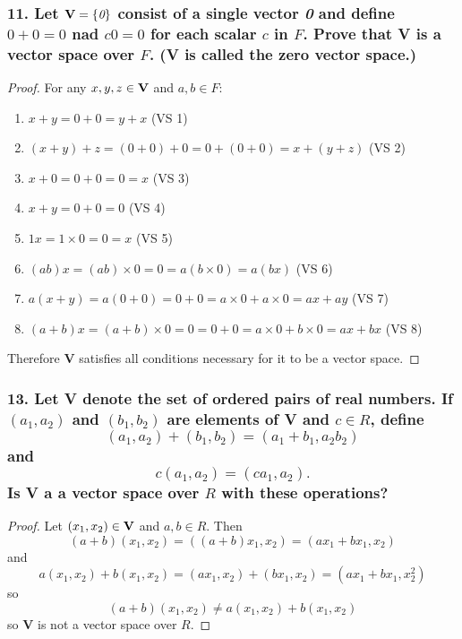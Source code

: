\documentclass{article}
\begin{document}
\subsubsection*{11. Let $\textbf{\textup{V}} = \{\textit{0}\}$ consist of a single vector \textit{0} and define $\textit{0} + \textit{0} = \textit{0}$ nad $c\textit{0} = \textit{0}$ for each scalar $c$ in $F$. Prove that \textbf{V} is a vector space over $F$. (\textbf{V} is called the \textbf{zero vector space}.)}
\begin{proof}
	For any $x,y,z \in \textbf{\textup{V}}$ and $a,b \in F$:
	\begin{enumerate}
		\item $x + y = 0 + 0 = y + x$ (VS 1)
		\item $(x + y) + z = (0 + 0) + 0 = 0 + (0 + 0) = x + (y + z)$ (VS 2)
		\item $x + 0 = 0 + 0 = 0 = x$ (VS 3)
		\item $x + y = 0 + 0 = 0$ (VS 4)
		\item $1x = 1 \times 0 = 0 = x$ (VS 5)
		\item $(ab)x = (ab) \times 0 = 0 = a (b \times 0) = a(bx)$ (VS 6)
		\item $a(x + y) = a(0 + 0) = 0 + 0 = a \times 0 + a \times 0 = ax + ay$ (VS 7)
		\item $(a + b)x = (a + b) \times 0 = 0 = 0 + 0 = a \times 0 + b \times 0 = ax + bx$ (VS 8)
	\end{enumerate}
	Therefore \textbf{V} satisfies all conditions necessary for it to be a vector space.
\end{proof}

\pagebreak

\subsubsection*{13. Let \textbf{V} denote the set of ordered pairs of real numbers. If $(a_1, a_2)$ and $(b_1, b_2)$ are elements of \textbf{V} and $c \in R$, define \[(a_1, a_2) + (b_1, b_2) = (a_1 + b_1, a_2b_2)\] and \[c(a_1, a_2) = (ca_1, a_2).\] Is \textbf{V} a a vector space over $R$ with these operations?}
\begin{proof}
	Let $(x_1, x_2) \in \textbf{\textup{V}}$ and $a,b \in R$. Then \[(a + b)(x_1, x_2) = ((a + b)x_1, x_2) = (ax_1 + bx_1, x_2)\]and \[a(x_1, x_2) + b(x_1, x_2) = (ax_1, x_2) + (bx_1, x_2) = (ax_1 + bx_1, x_2^2)\]so \[(a + b)(x_1, x_2) \ne a(x_1, x_2) + b(x_1, x_2)\]so \textbf{V} is not a vector space over $R$.
\end{proof}
\end{document}
